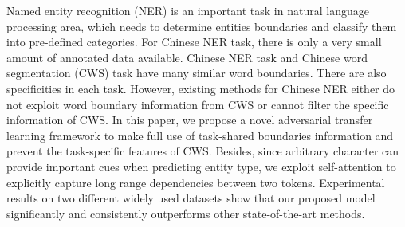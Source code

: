 Named entity recognition (NER) is an important task in natural language processing area, which needs to determine entities boundaries and classify them into pre-defined categories. For Chinese NER task, there is only a very small amount of annotated data available. Chinese NER task and Chinese word segmentation (CWS) task have many similar word boundaries. There are also specificities in each task. However, existing methods for Chinese NER either do not exploit word boundary information from CWS or cannot filter the specific information of CWS. In this paper, we propose a novel adversarial transfer learning framework to make full use of task-shared boundaries information and prevent the task-specific features of  CWS. Besides, since arbitrary character can provide important cues when predicting entity type, we exploit self-attention to explicitly capture long range dependencies between two tokens. Experimental results on two different widely used datasets show that our proposed model significantly and consistently outperforms other state-of-the-art methods.
